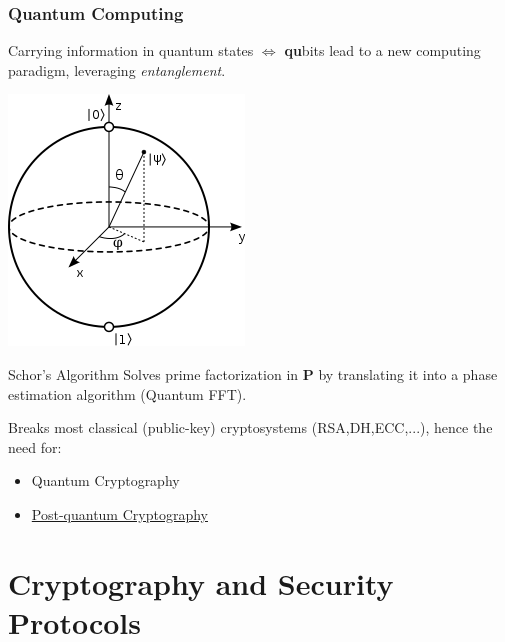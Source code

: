 \begin{frame}
\frametitle{Quantum Computing}
\begin{minipage}{0.6\columnwidth}
Carrying information  in  quantum states $\iff$ {\bf qu}bits
lead to a new computing paradigm, leveraging \emph{entanglement}.
\end{minipage}
\begin{minipage}{0.3\columnwidth}
\hfill \includegraphics[scale=0.35]{img/Bloch_sphere.png}
\end{minipage}

\pause

\begin{block}
{Schor's Algorithm}
Solves prime factorization in {\bf P} by 
translating it into a phase estimation algorithm (Quantum FFT).
\end{block}
\pause
Breaks most classical (public-key) cryptosystems (RSA,DH,ECC,...), hence the need for:
\begin{itemize}
\item Quantum Cryptography
\item  \href{https://csrc.nist.gov/Projects/Post-Quantum-Cryptography/Round-1-Submissions}{Post-quantum Cryptography}  
\end{itemize}

\end{frame}

\section[Cryptography]{Cryptography and Security Protocols}

